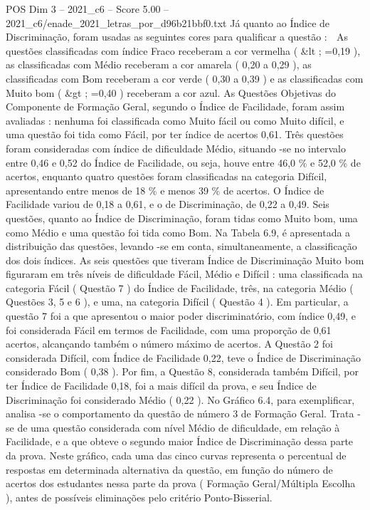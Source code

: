 \begin{textsample}{POS Dim 3 – 2021\_c6 – Score 5.00 – 2021\_c6/enade\_2021\_letras\_por\_d96b21bbf0.txt}
Já quanto ao Índice de Discriminação, foram usadas as seguintes cores para qualificar a questão :  As questões classificadas com índice Fraco receberam a cor vermelha ( \&lt ; =0,19 ), as classificadas com Médio receberam a cor amarela ( 0,20 a 0,29 ), as classificadas com Bom receberam a cor verde ( 0,30 a 0,39 ) e as classificadas com Muito bom ( \&gt ; =0,40 ) receberam a cor azul.
As Questões Objetivas do Componente de Formação Geral, segundo o Índice de Facilidade, foram assim avaliadas : nenhuma foi classificada como Muito fácil ou como Muito difícil, e uma questão foi tida como Fácil, por ter índice de acertos 0,61.
Três questões foram consideradas com índice de dificuldade Médio, situando -se no intervalo entre 0,46 e 0,52 do Índice de Facilidade, ou seja, houve entre 46,0 \% e 52,0 \% de acertos, enquanto quatro questões foram classificadas na categoria Difícil, apresentando entre menos de 18 \% e menos 39 \% de acertos.
O Índice de Facilidade variou de 0,18 a 0,61, e o de Discriminação, de 0,22 a 0,49.
Seis questões, quanto ao Índice de Discriminação, foram tidas como Muito bom, uma como Médio e uma questão foi tida como Bom.
Na Tabela 6.9, é apresentada a distribuição das questões, levando -se em conta, simultaneamente, a classificação dos dois índices.
As seis questões que tiveram Índice de Discriminação Muito bom figuraram em três níveis de dificuldade Fácil, Médio e Difícil : uma classificada na categoria Fácil ( Questão 7 ) do Índice de Facilidade, três, na categoria Médio ( Questões 3, 5 e 6 ), e uma, na categoria Difícil ( Questão 4 ).
Em particular, a questão 7 foi a que apresentou o maior poder discriminatório, com índice 0,49, e foi considerada Fácil em termos de Facilidade, com uma proporção de 0,61 acertos, alcançando também o número máximo de acertos.
A Questão 2 foi considerada Difícil, com Índice de Facilidade 0,22, teve o Índice de Discriminação considerado Bom ( 0,38 ).
Por fim, a Questão 8, considerada também Difícil, por ter Índice de Facilidade 0,18, foi a mais difícil da prova, e seu Índice de Discriminação foi considerado Médio ( 0,22 ).
No Gráfico 6.4, para exemplificar, analisa -se o comportamento da questão de número 3 de Formação Geral.
Trata -se de uma questão considerada com nível Médio de dificuldade, em relação à Facilidade, e a que obteve o segundo maior Índice de Discriminação dessa parte da prova.
Neste gráfico, cada uma das cinco curvas representa o percentual de respostas em determinada alternativa da questão, em função do número de acertos dos estudantes nessa parte da prova ( Formação Geral/Múltipla Escolha ), antes de possíveis eliminações pelo critério Ponto-Bisserial.

\end{textsample}
